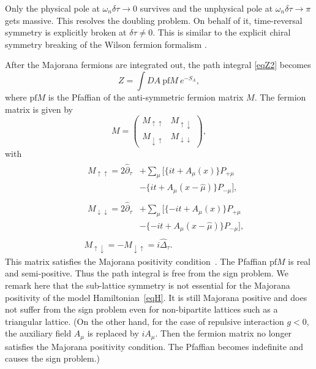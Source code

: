 \documentclass[aps,prb,superscriptaddress,twocolumn]{revtex4-1}
\newcommand{\pf}{\mathrm{pf}}
\begin{document}
Only the physical pole at $\omega_n\delta \tau \to 0$ survives and the unphysical pole at $\omega_n\delta \tau \to \pi$ gets massive.
This resolves the doubling problem.
On behalf of it, time-reversal symmetry is explicitly broken at $\delta\tau \ne 0$.
This is similar to the explicit chiral symmetry breaking of the Wilson fermion formalism \cite{wilson1977quarks}.

After the Majorana fermions are integrated out, the path integral \eqref{eqZ2} becomes
\begin{equation}
 Z = \int DA \ \pf M \ e^{-S_A}
,
\label{eqZ3}
\end{equation}
where $\pf M $ is the Pfaffian of the anti-symmetric fermion matrix $M$.
The fermion matrix is given by
\begin{equation}
M =
\begin{pmatrix}
M_{\uparrow\uparrow} & M_{\uparrow\downarrow}
 \\
M_{\downarrow\uparrow} & M_{\downarrow\downarrow}
\end{pmatrix},
\end{equation}
with 
\begin{eqnarray}
&&
\begin{split}
 M_{\uparrow\uparrow} = 2 \hat{\partial}_\tau &+ \sum_\mu [ \{it+A_\mu(x)\}P_{+\mu} 
\\
&- \{it+A_\mu(x-\hat{\mu})\}P_{-\mu} ] ,
\end{split} 
\\
&&
\begin{split}
 M_{\downarrow\downarrow} = 2 \hat{\partial}_\tau &+ \sum_\mu [ \{-it+A_\mu(x)\}P_{+\mu}
\\
&- \{-it+A_\mu(x-\hat{\mu})\}P_{-\mu} ] ,
\end{split}
\\
&&
 M_{\uparrow\downarrow} = - M_{\downarrow\uparrow} = i \hat{\Delta}_\tau
.
\end{eqnarray}
This matrix satisfies the Majorana positivity condition~\cite{Hayata:2017jdh}.
The Pfaffian $\pf M$ is real and semi-positive.
Thus the path integral is free from the sign problem.
We remark here that the sub-lattice symmetry is not essential for the Majorana positivity of the model Hamiltonian~\eqref{eqH}.
It is still Majorana positive and does not suffer from the sign problem even for non-bipartite lattices such as a triangular lattice.
(On the other hand, for the case of repulsive interaction $g<0$, the auxiliary field $A_\mu$ is replaced by $i A_\mu$.
Then the fermion matrix no longer satisfies the Majorana positivity condition. 
The Pfaffian becomes indefinite and causes the sign problem.)
\end{document}
